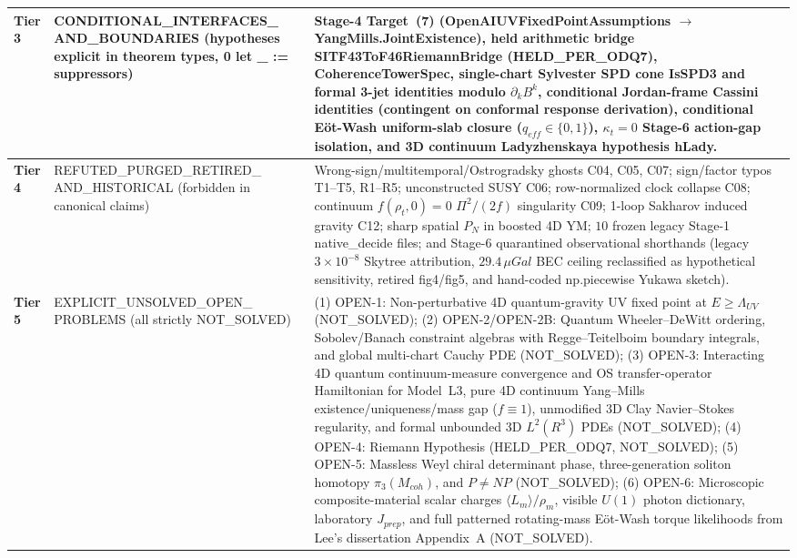 \documentclass[american,11pt,letterpaper]{article}
\def\mathbb#1{#1}%
\def\mathcal#1{#1}%
\def\mathrm#1{#1}%
\def\texttt#1{#1}%
\def\emph#1{#1}%
\begin{document}
\begin{longtable}{|p{2.3cm}|p{4.3cm}|p{8.4cm}|}
\hline
\textbf{Tier 3} & \texttt{CONDITIONAL\_\allowbreak{}INTERFACES\_\allowbreak{}} \texttt{AND\_BOUNDARIES} (hypotheses explicit in theorem types, \texttt{0 let \_ :=} suppressors) & Stage-4 Target~\texttt{(7)} (\texttt{OpenAI\allowbreak{}UV\allowbreak{}Fixed\allowbreak{}Point\allowbreak{}Assumptions} $\to$ \texttt{YangMills.\allowbreak{}Joint\allowbreak{}Existence}), held arithmetic bridge \texttt{SITF43\allowbreak{}To\allowbreak{}F46\allowbreak{}Riemann\allowbreak{}Bridge} (\texttt{HELD\_PER\_ODQ7}), \texttt{CoherenceTowerSpec}, single-chart Sylvester SPD cone \texttt{IsSPD3} and formal 3-jet identities modulo $\partial_k B^k$, conditional Jordan-frame Cassini identities (contingent on conformal response derivation), conditional E\"ot-Wash uniform-slab closure ($q_{\mathrm{eff}} \in \{0,1\}$), $\kappa_t = 0$ Stage-6 action-gap isolation, and 3D continuum Ladyzhenskaya hypothesis \texttt{hLady}. \\
\hline
\textbf{Tier 4} & \texttt{REFUTED\_\allowbreak{}PURGED\_\allowbreak{}RETIRED\_\allowbreak{}} \texttt{AND\_HISTORICAL} (forbidden in canonical claims) & Wrong-sign/multitemporal/Ostrogradsky ghosts \texttt{C04}, \texttt{C05}, \texttt{C07}; sign/factor typos \texttt{T1}--\texttt{T5}, \texttt{R1}--\texttt{R5}; unconstructed SUSY \texttt{C06}; row-normalized clock collapse \texttt{C08}; continuum $f(\rho_t,0)=0$ $\Pi^2/(2f)$ singularity \texttt{C09}; 1-loop Sakharov induced gravity \texttt{C12}; sharp spatial $P_N$ in boosted 4D YM; $10$ frozen legacy Stage-1 \texttt{native\_decide} files; and Stage-6 quarantined observational shorthands (legacy $3\times 10^{-8}$ Skytree attribution, $29.4\,\mu\mathrm{Gal}$ BEC ceiling reclassified as hypothetical sensitivity, retired \texttt{fig4}/\texttt{fig5}, and hand-coded \texttt{np.piecewise} Yukawa sketch). \\
\hline
\textbf{Tier 5} & \texttt{EXPLICIT\_\allowbreak{}UNSOLVED\_\allowbreak{}OPEN\_\allowbreak{}} \texttt{PROBLEMS} (all strictly \texttt{NOT\_SOLVED}) & (1) \texttt{OPEN-1}: Non-perturbative 4D quantum-gravity UV fixed point at $E \ge \Lambda_{\mathrm{UV}}$ (\texttt{NOT\_SOLVED}); (2) \texttt{OPEN-2}/\texttt{OPEN-2B}: Quantum Wheeler--DeWitt ordering, Sobolev/Banach constraint algebras with Regge--Teitelboim boundary integrals, and global multi-chart Cauchy PDE (\texttt{NOT\_SOLVED}); (3) \texttt{OPEN-3}: Interacting 4D \emph{quantum} continuum-measure convergence and OS transfer-operator Hamiltonian for Model~L3, pure 4D continuum Yang--Mills existence/uniqueness/mass gap ($f\equiv 1$), unmodified 3D Clay Navier--Stokes regularity, and formal unbounded 3D $L^2(\mathbb{R}^3)$ PDEs (\texttt{NOT\_SOLVED}); (4) \texttt{OPEN-4}: Riemann Hypothesis (\texttt{HELD\_PER\_ODQ7}, \texttt{NOT\_SOLVED}); (5) \texttt{OPEN-5}: Massless Weyl chiral determinant phase, three-generation soliton homotopy $\pi_3(\mathcal{M}_{\mathrm{coh}})$, and $P \ne NP$ (\texttt{NOT\_SOLVED}); (6) \texttt{OPEN-6}: Microscopic composite-material scalar charges $\langle\mathcal{L}_m\rangle/\rho_m$, visible $U(1)$ photon dictionary, laboratory $J_{\mathrm{prep}}$, and full patterned rotating-mass E\"ot-Wash torque likelihoods from Lee's dissertation Appendix~A (\texttt{NOT\_SOLVED}). \\

\end{longtable}
\end{document}
